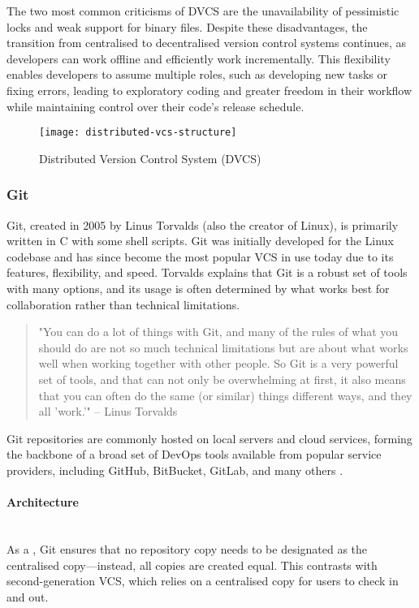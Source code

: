 The two most common criticisms of DVCS are the unavailability of pessimistic locks and weak support for binary files. Despite these disadvantages, the transition from centralised to decentralised version control systems continues, as developers can work offline and efficiently work incrementally. This flexibility enables developers to assume multiple roles, such as developing new tasks or fixing errors, leading to exploratory coding and greater freedom in their workflow while maintaining control over their code's release schedule.

\begin{figure}[htbp]
    \centering
    \texttt{[image: distributed-vcs-structure]}
    \caption{Distributed Version Control System (DVCS)}
    \label{fig:dvcs-structure}
\end{figure}

\subsubsection{Git}
\label{sec:git}
Git, created in 2005 by Linus Torvalds (also the creator of Linux), is primarily written in C with some shell scripts. Git was initially developed for the Linux codebase and has since become the most popular VCS in use today due to its features, flexibility, and speed. Torvalds explains that Git is a robust set of tools with many options, and its usage is often determined by what works best for collaboration rather than technical limitations.

\begin{quote}
    "You can do a lot of things with Git, and many of the rules of what you should do are not so much technical limitations but are about what works well when working together with other people. So Git is a very powerful set of tools, and that can not only be overwhelming at first, it also means that you can often do the same (or similar) things different ways, and they all 'work.'" -- Linus Torvalds \cite{cloer_2019}
\end{quote}

Git repositories are commonly hosted on local servers and cloud services, forming the backbone of a broad set of DevOps tools available from popular service providers, including GitHub, BitBucket, GitLab, and many others \cite{stopak_2019}.
\paragraph{Architecture}
\hfill\medskip\\
As a , Git ensures that no repository copy needs to be designated as the centralised copy—instead, all copies are created equal. This contrasts with second-generation VCS, which relies on a centralised copy for users to check in and out.
\smallskip

